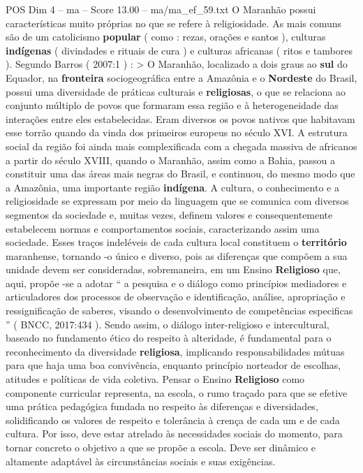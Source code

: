 \begin{textsample}{POS Dim 4 – ma – Score 13.00 – ma/ma\_ef\_59.txt}
O Maranhão possui características muito próprias no que se refere à religiosidade.
As mais comuns são de um catolicismo \textbf{popular} ( como : rezas, orações e santos ), culturas \textbf{indígenas} ( divindades e rituais de cura ) e culturas africanas ( ritos e tambores ).
Segundo Barros ( 2007:1 ) : > O Maranhão, localizado a dois graus ao \textbf{sul} do Equador, na \textbf{fronteira} sociogeográfica entre a Amazônia e o \textbf{Nordeste} do Brasil, possui uma diversidade de práticas culturais e \textbf{religiosas}, o que se relaciona ao conjunto múltiplo de povos que formaram essa região e à heterogeneidade das interações entre eles estabelecidas.
Eram diversos os povos nativos que habitavam esse torrão quando da vinda dos primeiros europeus no século XVI.
A estrutura social da região foi ainda mais complexificada com a chegada massiva de africanos a partir do século XVIII, quando o Maranhão, assim como a Bahia, passou a constituir uma das áreas mais negras do Brasil, e continuou, do mesmo modo que a Amazônia, uma importante região \textbf{indígena}.
A cultura, o conhecimento e a religiosidade se expressam por meio da linguagem que se comunica com diversos segmentos da sociedade e, muitas vezes, definem valores e consequentemente estabelecem normas e comportamentos sociais, caracterizando assim uma sociedade.
Esses traços indeléveis de cada cultura local constituem o \textbf{território} maranhense, tornando -o único e diverso, pois as diferenças que compõem a sua unidade devem ser consideradas, sobremaneira, em um Ensino \textbf{Religioso} que, aqui, propõe -se a adotar “ a pesquisa e o diálogo como princípios mediadores e articuladores dos processos de observação e identificação, análise, apropriação e ressignificação de saberes, visando o desenvolvimento de competências especificas ” ( BNCC, 2017:434 ).
Sendo assim, o diálogo inter-religioso e intercultural, baseado no fundamento ético do respeito à alteridade, é fundamental para o reconhecimento da diversidade \textbf{religiosa}, implicando responsabilidades mútuas para que haja uma boa convivência, enquanto princípio norteador de escolhas, atitudes e políticas de vida coletiva.
Pensar o Ensino \textbf{Religioso} como componente curricular representa, na escola, o rumo traçado para que se efetive uma prática pedagógica fundada no respeito às diferenças e diversidades, solidificando os valores de respeito e tolerância à crença de cada um e de cada cultura.
Por isso, deve estar atrelado às necessidades sociais do momento, para tornar concreto o objetivo a que se propõe a escola.
Deve ser dinâmico e altamente adaptável às circunstâncias sociais e suas exigências.

\end{textsample}
